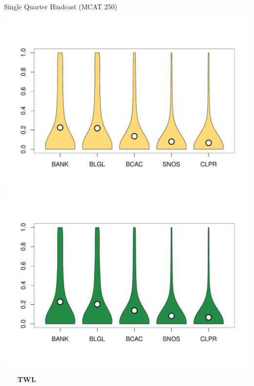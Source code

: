 \documentclass[ xcolor = pdftex, dvipsnames, table ]{beamer}
\begin{document}
\begin{frame}{Single Quarter Hindcast (MCAT 250)}
\begin{minipage}{0.29\textwidth}
\includegraphics[height=0.36\textheight]{../pictures/vioStarAvgOLANET.pdf}\\
\vspace*{-1.3cm}
\includegraphics[height=0.36\textheight]{../pictures/vioStarAvgOSDNET.pdf}
\end{minipage}
\hspace*{0.5cm}
\begin{minipage}{0.29\textwidth}
\begin{center}
$~~~~~~~~~$\textbf{TWL}
\end{center}
\vspace*{-0.75cm}

\end{minipage}
\end{frame}
\end{document}
